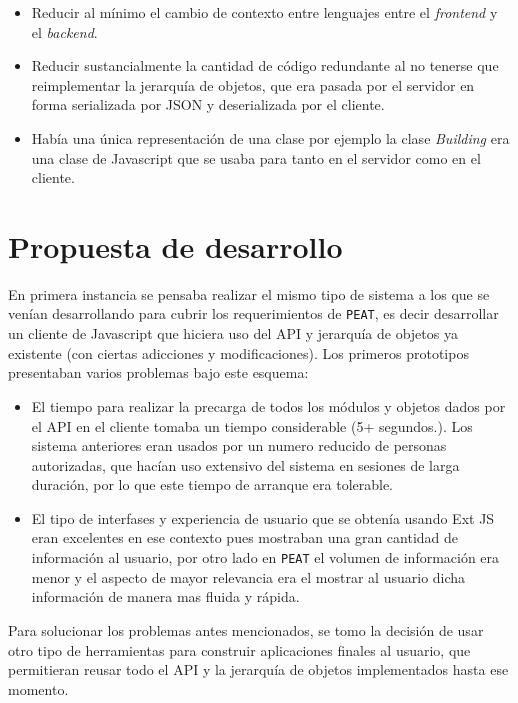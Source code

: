 \begin{itemize}
\item Reducir al mínimo el cambio de contexto entre lenguajes entre
  el \textit{frontend} y el \textit{backend}.
\item Reducir sustancialmente la cantidad de código redundante al no
  tenerse que reimplementar la jerarquía de objetos, que era pasada
  por el servidor en forma serializada por JSON y deserializada por el
  cliente.
\item Había una única representación de una clase por ejemplo la
  clase \textit{Building} era una clase de Javascript que se usaba para
  tanto en el servidor como en el cliente.
\end{itemize}

\section{Propuesta de desarrollo}
En primera instancia se pensaba realizar el mismo tipo de sistema
a los que se venían desarrollando para cubrir los requerimientos
de \texttt{PEAT}, es decir desarrollar un cliente de Javascript
que hiciera uso del API y jerarquía de objetos ya
existente (con ciertas adicciones y modificaciones). Los primeros
prototipos presentaban varios problemas bajo este esquema:

\begin{itemize}
\item El tiempo para realizar la precarga de todos los módulos y
  objetos dados por el API en el cliente tomaba un tiempo
  considerable (5+ segundos.). Los sistema anteriores eran usados
  por un numero reducido de personas autorizadas, que hacían uso
  extensivo del sistema en sesiones de larga duración, por lo
  que este tiempo de arranque era tolerable.
\item El tipo de interfases y experiencia de usuario que se obtenía
  usando Ext JS eran excelentes en ese contexto pues mostraban una gran
  cantidad de información al usuario, por otro lado en \texttt{PEAT}
  el volumen de información era menor y el aspecto de mayor relevancia
  era el mostrar al usuario dicha información de manera mas fluida y rápida.
\end{itemize}

Para solucionar los problemas antes mencionados, se tomo la decisión de
usar otro tipo de herramientas para construir aplicaciones finales al usuario,
que permitieran reusar todo el API y la jerarquía de objetos implementados
hasta ese momento.

